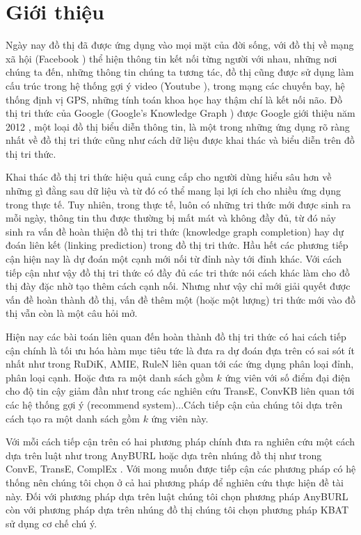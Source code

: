 \chapter{Giới thiệu}
\label{chap:Introduction}

Ngày nay đồ thị đã được ứng dụng vào mọi mặt của đời sống, với đồ thị về mạng xã hội (Facebook \cite{ugander2011anatomy}) thể hiện thông tin kết nối từng người với nhau, những nơi chúng ta đến, những thông tin chúng ta tương tác, đồ thị cũng được sử dụng làm cấu trúc trong hệ thống gợi ý video (Youtube \cite{baluja2008video}), trong mạng các chuyến bay, hệ thống định vị GPS, những tính toán khoa học hay thậm chí là kết nối não. Đồ thị tri thức của Google (Google's Knowledge Graph \cite{googlekg:2020}) được Google giới thiệu năm 2012 \cite{ji2020survey}, một loại đồ thị biểu diễn thông tin, là một trong những ứng dụng rõ ràng nhất về đồ thị tri thức cũng như cách dữ liệu được khai thác và biểu diễn trên đồ thị tri thức.

Khai thác đồ thị tri thức hiệu quả cung cấp cho người dùng hiểu sâu hơn về những gì đằng sau dữ liệu và từ đó có thể mang lại lợi ích cho nhiều ứng dụng trong thực tế. Tuy nhiên, trong thực tế, luôn có những tri thức mới được sinh ra mỗi ngày, thông tin thu được thường bị mất mát và không đầy đủ, từ đó nảy sinh ra vấn đề hoàn thiện đồ thị tri thức (knowledge graph completion) hay dự đoán liên kết (linking prediction) trong đồ thị tri thức.
Hầu hết các phương tiếp cận hiện nay là dự đoán một cạnh mới nối từ đỉnh này tới đỉnh khác. Với cách tiếp cận như vậy đồ thị tri thức có đầy đủ các tri thức nói cách khác làm cho đồ thị đày đặc nhờ tạo thêm cách cạnh nối. Nhưng như vậy chỉ mới giải quyết được vấn đề hoàn thành đồ thị, vấn đề thêm một (hoặc một lượng) tri thức mới vào đồ thị vẫn còn là một câu hỏi mở.

Hiện nay các bài toán liên quan đến hoàn thành đồ thị tri thức có hai cách tiếp cận chính là tối ưu hóa hàm mục tiêu tức là đưa ra dự đoán đựa trên có sai sót ít nhất như trong RuDiK\cite{ortona2018robust}, AMIE\cite{galarraga2015fast}, RuleN\cite{meilicke2018fine} liên quan tới các ứng dụng phân loại đỉnh, phân loại cạnh. Hoặc đưa ra một danh sách gồm \(k\) ứng viên với số điểm đại điện cho độ tin cậy giảm đần như trong các nghiên cứu TransE\cite{bordes2013translating}, ConvKB\cite{vu2019capsule} liên quan tới các hệ thống gợi ý (recommend system)...Cách tiếp cận của chúng tôi dựa trên cách tạo ra một danh sách gồm \(k\) ứng viên này.

Với mỗi cách tiếp cận trên có hai phương pháp chính đưa ra nghiên cứu một cách dựa trên luật như trong AnyBURL\cite{burl} hoặc dựa trên nhúng đồ thị như trong ConvE\cite{dettmers2017convolutional}, TransE\cite{bordes2013translating}, ComplEx \cite{trouillon2016complex}. Với mong muốn được tiếp cận các phương pháp có hệ thống nên chúng tôi chọn ở cả hai phương pháp để nghiên cứu thực hiện đề tài này. Đối với phương pháp dựa trên luật chúng tôi chọn phương pháp AnyBURL\cite{burl} còn với phương pháp dựa trên nhúng đồ thị chúng tôi chọn phương pháp KBAT \cite{nathani2019learning} sử dụng cơ chế chú  ý.

